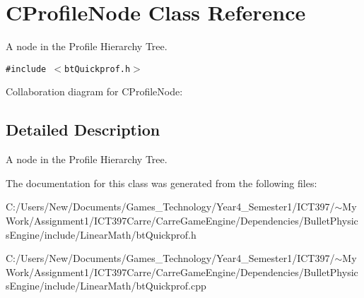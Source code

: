 \hypertarget{class_c_profile_node}{
\section{CProfileNode Class Reference}
\label{class_c_profile_node}
}
A node in the Profile Hierarchy Tree.  


{\tt \#include $<$btQuickprof.h$>$}

Collaboration diagram for CProfileNode:

\subsection{Detailed Description}
A node in the Profile Hierarchy Tree. 

The documentation for this class was generated from the following files:\begin{CompactItemize}
\item 
C:/Users/New/Documents/Games\_\-Technology/Year4\_\-Semester1/ICT397/$\sim$My Work/Assignment1/ICT397Carre/CarreGameEngine/Dependencies/BulletPhysicsEngine/include/LinearMath/btQuickprof.h\item 
C:/Users/New/Documents/Games\_\-Technology/Year4\_\-Semester1/ICT397/$\sim$My Work/Assignment1/ICT397Carre/CarreGameEngine/Dependencies/BulletPhysicsEngine/include/LinearMath/btQuickprof.cpp\end{CompactItemize}
